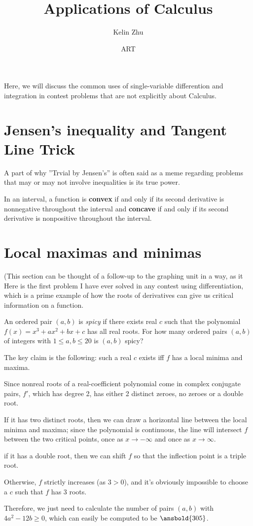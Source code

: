 \documentclass{article}
\title{Applications of Calculus}
\author{Kelin Zhu}
\date{ART}
\begin{document}
\maketitle
Here, we will discuss the common uses of single-variable differention and integration in contest problems that are not explicitly about Calculus.
\section{Jensen's inequality and Tangent Line Trick}
A part of why ''Trvial by Jensen's'' is often said as a meme regarding problems that may or may not involve inequalities is its true power.
\begin{theo}
In an interval, a function is \textbf{convex} if and only if its second derivative is nonnegative throughout the interval and \textbf{concave} if and only if its second derivative is nonpositive throughout the interval.

\end{theo}
\section{Local maximas and minimas}
(This section can be thought of a follow-up to the graphing unit in a way, as it 
Here is the first problem I have ever solved in any contest using differentiation, which is a prime example of how the roots of derivatives can give us critical information on a function.
\begin{exam}
An ordered pair $(a,b)$ is \textit{spicy} if there exists real $c$ such that the polynomial $f(x)=x^3+ax^2+bx+c$ has all real roots. For how many ordered pairs $(a,b)$ of integers with $1\le a,b\le 20$ is $(a,b)$ spicy?
\end{exam}
\begin{sol}
The key claim is the following: such a real $c$ exists iff $f$ has a local minima and maxima.

Since nonreal roots of a real-coefficient polynomial come in complex conjugate pairs, $f'$, which has degree 2, has either 2 distinct zeroes, no zeroes or a double root.

If it has two distinct roots, then we can draw a horizontal line between the local minima and maxima; since the polynomial is continuous, the line will intersect $f$ between the two critical points, once as $x\rightarrow -\infty$ and once as $x\rightarrow \infty$.

if it has a double root, then we can shift $f$ so that the inflection point is a triple root.

Otherwise, $f$ strictly increases (as $3>0$), and it's obviously impossible to choose a $c$ such that $f$ has 3 roots.

Therefore, we just need to calculate the number of pairs $(a,b)$ with $4a^2-12b\ge 0$, which can easily be computed to be $\ansbold{305}$.
\end{sol}
\end{document}
